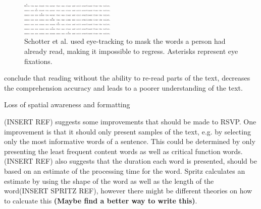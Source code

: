 \begin{figure}[htbp]
\centering
\includegraphics[width=0.4\textwidth]{Pics/trace_crosses}
\caption{Schotter et al. used eye-tracking to mask the words a person had already read, making it impossible to regress. Asterisks represent eye fixations.}
\label{fig:trace_cross}
\end{figure}

\citeauthor{schotter_dont_2014} conclude that reading without the ability to re-read parts of the text, decreases the comprehension accuracy and leads to a poorer understanding of the text.

Loss of spatial awareness and formatting

(INSERT REF) suggests some improvements that should be made to RSVP. One improvement is that it should only present samples of the text, e.g. by selecting only the most informative words of a sentence. This could be determined by only presenting the least frequent content words as well as critical function words. (INSERT REF) also suggests that the duration each word is presented, should be based on an estimate of the processing time for the word. Spritz calculates an estimate by using the shape of the word as well as the length of the word(INSERT SPRITZ REF), however there might be different theories on how to calcuate this \textbf{(Maybe find a better way to write this)}.